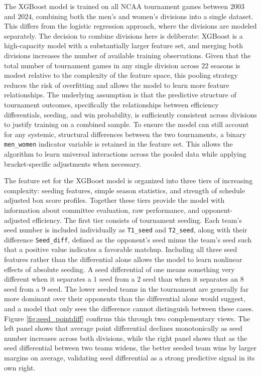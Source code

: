 \documentclass[12pt,leqno]{article}\usepackage[pdftex]{graphicx}\usepackage[dvipsnames]{xcolor}
\theoremstyle{remark}
\begin{document}
The XGBoost model is trained on all NCAA tournament games between $2003$ and $2024$, combining both the men's and women's divisions into a single dataset. This differs from the logistic regression approach, where the divisions are modeled separately. The decision to combine divisions here is deliberate: XGBoost is a high-capacity model with a substantially larger feature set, and merging both divisions increases the number of available training observations. Given that the total number of tournament games in any single division across $22$ seasons is modest relative to the complexity of the feature space, this pooling strategy reduces the risk of overfitting and allows the model to learn more feature relationships. The underlying assumption is that the predictive structure of tournament outcomes, specifically the relationships between efficiency differentials, seeding, and win probability, is sufficiently consistent across divisions to justify training on a combined sample. To ensure the model can still account for any systemic, structural differences between the two tournaments, a binary \texttt{men\_women} indicator variable is retained in the feature set. This allows the algorithm to learn universal interactions across the pooled data while applying bracket-specific adjustments when necessary. 

The feature set for the XGBoost model is organized into three tiers of increasing complexity: seeding features, simple season statistics, and strength of schedule adjusted box score profiles. Together these tiers provide the model with information about committee evaluation, raw performance, and opponent-adjusted efficiency. The first tier consists of tournament seeding. Each team's seed number is included individually as \texttt{T1\_seed} and \texttt{T2\_seed}, along with their difference \texttt{Seed\_diff}, defined as the opponent's seed minus the team's seed such that a positive value indicates a favorable matchup. Including all three seed features rather than the differential alone allows the model to learn nonlinear effects of absolute seeding. A seed differential of one means something very different when it separates a $1$ seed from a $2$ seed than when it separates an $8$ seed from a $9$ seed. The lower seeded teams in the tournament are generally far more dominant over their opponents than the differential alone would suggest, and a model that only sees the difference cannot distinguish between these cases. Figure \ref{fig:seed_pointdiff} confirms this through two complementary views. The left panel shows that average point differential declines monotonically as seed number increases across both divisions, while the right panel shows that as the seed differential between two teams widens, the better seeded team wins by larger margins on average, validating seed differential as a strong predictive signal in its own right.
\end{document}

